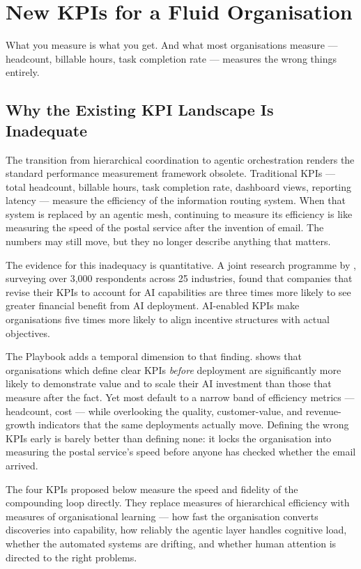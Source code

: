 \chapter{New KPIs for a Fluid Organisation}
\label{ch:new-kpis}

\epigraph{What you measure is what you get. And what most organisations measure --- headcount, billable hours, task completion rate --- measures the wrong things entirely.}{}

\section{Why the Existing KPI Landscape Is Inadequate}

The transition from hierarchical coordination to agentic orchestration renders the standard performance measurement framework obsolete. Traditional KPIs --- total headcount, billable hours, task completion rate, dashboard views, reporting latency --- measure the efficiency of the information routing system. When that system is replaced by an agentic mesh, continuing to measure its efficiency is like measuring the speed of the postal service after the invention of email. The numbers may still move, but they no longer describe anything that matters.

The evidence for this inadequacy is quantitative. A joint research programme by \textcite{BCGAIKPIs2025}, surveying over 3,000 respondents across 25 industries, found that companies that revise their KPIs to account for AI capabilities are three times more likely to see greater financial benefit from AI deployment. AI-enabled KPIs make organisations five times more likely to align incentive structures with actual objectives.

The Playbook adds a temporal dimension to that finding. \textcite{Pereira2026Playbook} shows that organisations which define clear KPIs \emph{before} deployment are significantly more likely to demonstrate value and to scale their AI investment than those that measure after the fact. Yet most default to a narrow band of efficiency metrics --- headcount, cost --- while overlooking the quality, customer-value, and revenue-growth indicators that the same deployments actually move. Defining the wrong KPIs early is barely better than defining none: it locks the organisation into measuring the postal service's speed before anyone has checked whether the email arrived.

The four KPIs proposed below measure the speed and fidelity of the compounding loop directly. They replace measures of hierarchical efficiency with measures of organisational learning --- how fast the organisation converts discoveries into capability, how reliably the agentic layer handles cognitive load, whether the automated systems are drifting, and whether human attention is directed to the right problems.

